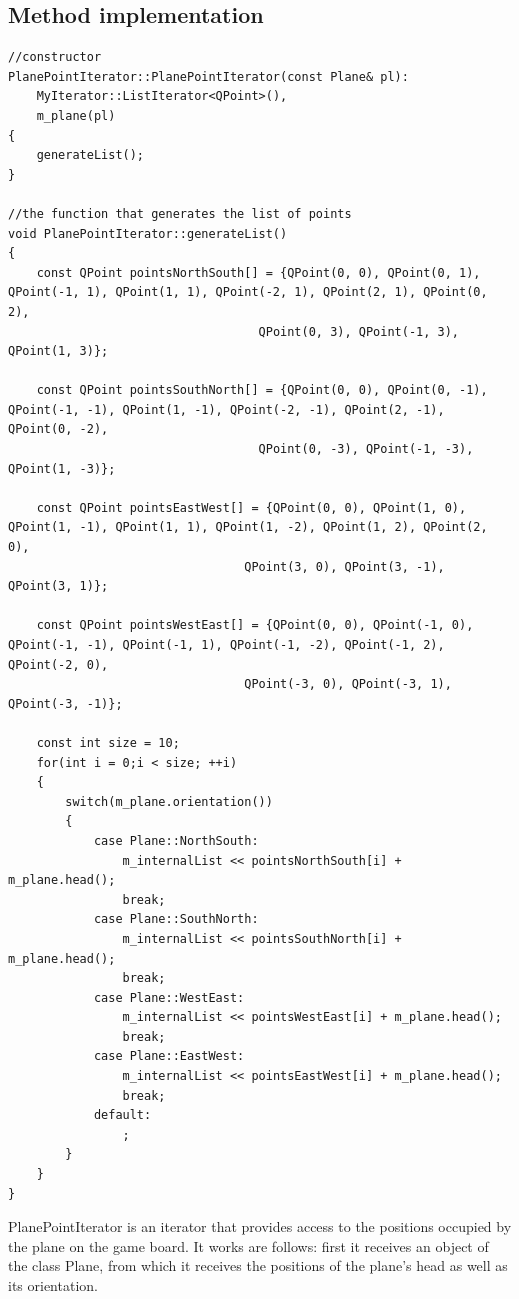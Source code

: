 \documentclass{article}
\begin{document}
\subsection {Method implementation}
\begin{lstlisting}
//constructor
PlanePointIterator::PlanePointIterator(const Plane& pl):
    MyIterator::ListIterator<QPoint>(),
    m_plane(pl)
{
    generateList();
}

//the function that generates the list of points
void PlanePointIterator::generateList()
{
    const QPoint pointsNorthSouth[] = {QPoint(0, 0), QPoint(0, 1), QPoint(-1, 1), QPoint(1, 1), QPoint(-2, 1), QPoint(2, 1), QPoint(0, 2),
                                   QPoint(0, 3), QPoint(-1, 3), QPoint(1, 3)};

    const QPoint pointsSouthNorth[] = {QPoint(0, 0), QPoint(0, -1), QPoint(-1, -1), QPoint(1, -1), QPoint(-2, -1), QPoint(2, -1), QPoint(0, -2),
                                   QPoint(0, -3), QPoint(-1, -3), QPoint(1, -3)};

    const QPoint pointsEastWest[] = {QPoint(0, 0), QPoint(1, 0), QPoint(1, -1), QPoint(1, 1), QPoint(1, -2), QPoint(1, 2), QPoint(2, 0),
                                 QPoint(3, 0), QPoint(3, -1), QPoint(3, 1)};

    const QPoint pointsWestEast[] = {QPoint(0, 0), QPoint(-1, 0), QPoint(-1, -1), QPoint(-1, 1), QPoint(-1, -2), QPoint(-1, 2), QPoint(-2, 0),
                                 QPoint(-3, 0), QPoint(-3, 1), QPoint(-3, -1)};

    const int size = 10;
    for(int i = 0;i < size; ++i)
    {
        switch(m_plane.orientation())
        {
            case Plane::NorthSouth:
                m_internalList << pointsNorthSouth[i] + m_plane.head();
                break;
            case Plane::SouthNorth:
                m_internalList << pointsSouthNorth[i] + m_plane.head();
                break;
            case Plane::WestEast:
                m_internalList << pointsWestEast[i] + m_plane.head();
                break;
            case Plane::EastWest:
                m_internalList << pointsEastWest[i] + m_plane.head();
                break;
            default:
                ;
        }
    }
}

\end{lstlisting}

PlanePointIterator is an iterator that provides access to the positions occupied by the plane on the game board. It works are follows: first it receives an object of the class Plane, from which it receives the positions of the plane's head as well as its orientation.
\end{document}

